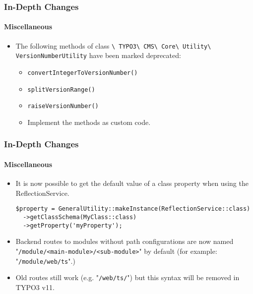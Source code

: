 \begin{frame}[fragile]
	\frametitle{In-Depth Changes}
	\framesubtitle{Miscellaneous}

	\begin{itemize}

		\item The following methods of class
			\smaller\texttt{\textbackslash
				TYPO3\textbackslash
				CMS\textbackslash
				Core\textbackslash
				Utility\textbackslash
				VersionNumberUtility}\normalsize\newline
			have been marked deprecated:

			\begin{itemize}
				\item \texttt{convertIntegerToVersionNumber()}
				\item \texttt{splitVersionRange()}
				\item \texttt{raiseVersionNumber()}
			\end{itemize}

			\begin{itemize}\smaller
				\item[\ding{228}] Implement the methods as custom code.
			\end{itemize}\normalsize

	\end{itemize}

\end{frame}


\begin{frame}[fragile]
	\frametitle{In-Depth Changes}
	\framesubtitle{Miscellaneous}

	\lstset{basicstyle=\tiny\ttfamily}

	\begin{itemize}
		\item It is now possible to get the default value of a class property
			when using the ReflectionService.
\begin{lstlisting}
$property = GeneralUtility::makeInstance(ReflectionService::class)
  ->getClassSchema(MyClass::class)
  ->getProperty('myProperty');
\end{lstlisting}

		\item Backend routes to modules without path configurations are now named\newline
			"\texttt{/module/<main-module>/<sub-module>}" by default\newline
			\small
				(for example: "\texttt{/module/web/ts}".)
			\normalsize

		\item Old routes still work (e.g. "\texttt{/web/ts/}") but this syntax will be removed in TYPO3 v11.

	\end{itemize}

\end{frame}

